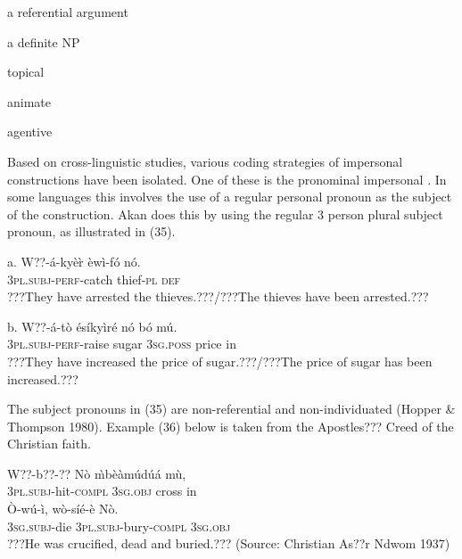 \documentclass[output=paper]{langsci/langscibook}
\begin{document}
\begin{styleNoSpacing}
a referential argument
\end{styleNoSpacing}

\begin{styleNoSpacing}
a definite NP
\end{styleNoSpacing}

\begin{styleNoSpacing}
topical
\end{styleNoSpacing}

\begin{styleNoSpacing}
animate
\end{styleNoSpacing}

\begin{styleNoSpacing}
agentive
\end{styleNoSpacing}

Based on cross-linguistic studies, various coding strategies of impersonal constructions have been isolated. One of these is the pronominal impersonal \citep{Siewierska2011}. In some languages this involves the use of a regular personal pronoun as the subject of the construction. Akan does this by using the regular 3 person plural subject pronoun, as illustrated in (35).

\ea
\gll a.  W??-á-kyè\`{r}    èwì-fó    nó.\\
       \textsc{3pl.subj}{}-\textsc{perf}{}-catch  thief-\textsc{pl}  \textsc{def}\\
\glt ???They have arrested the thieves.???/???The thieves have been arrested.???
\z

\ea
\gll  b.  W??-á-tò    ésíkyìré  nó    bó  mú.\\
       \textsc{3pl.subj}{}-\textsc{perf}{}-raise  sugar    \textsc{3sg.poss}  price  in\\
\glt   ???They have increased the price of sugar.???/???The price of sugar has been increased.???
\z

The subject pronouns in (35) are non-referential and non-individuated (Hopper \& Thompson 1980). Example (36) below is taken from the Apostles??? Creed of the Christian faith. 

\ea
\gll W??-b??-??       Nò    \`{m}bèàmúdúá  m\`{u}, \\
     \textsc{3pl.subj}{}-hit\textsc{{}-compl}  \textsc{3sg.obj}  cross    in\\
\gll \`{O}-wú-ì,     wò-síé-è     Nò.\\
     \textsc{3sg.subj}{}-die  \textsc{3pl.subj}{}-bury\textsc{{}-compl}  \textsc{3sg.obj}\\
\glt ???He was crucified, dead and buried.??? (Source: Christian As??r Ndwom 1937)
\z
\end{document}
